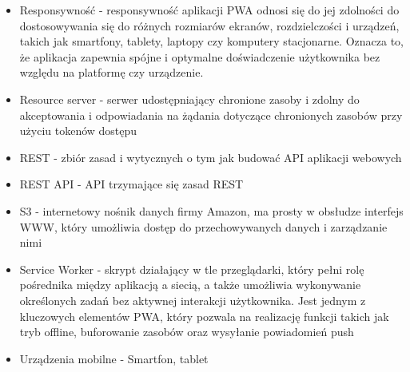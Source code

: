 \documentclass[../main.tex]{subfiles}
\begin{document}
\begin{itemize}
        \item Responsywność - responsywność aplikacji PWA odnosi się do jej zdolności do dostosowywania się do różnych rozmiarów ekranów, rozdzielczości i urządzeń, takich jak smartfony, tablety, laptopy czy komputery stacjonarne. Oznacza to, że aplikacja zapewnia spójne i optymalne doświadczenie użytkownika bez względu na platformę czy urządzenie.
        \item Resource server - serwer udostępniający chronione zasoby i zdolny do akceptowania i odpowiadania na żądania dotyczące chronionych zasobów przy użyciu tokenów dostępu
        \item REST - zbiór zasad i wytycznych o tym jak budować API aplikacji webowych
        \item REST API - API trzymające się zasad REST
        \item S3 -  internetowy nośnik danych firmy Amazon, ma prosty w obsłudze interfejs WWW, który umożliwia dostęp do przechowywanych danych i zarządzanie nimi
        \item Service Worker - skrypt działający w tle przeglądarki, który pełni rolę pośrednika między aplikacją a siecią, a także umożliwia wykonywanie określonych zadań bez aktywnej interakcji użytkownika. Jest jednym z kluczowych elementów PWA, który pozwala na realizację funkcji takich jak tryb offline, buforowanie zasobów oraz wysyłanie powiadomień push
        \item Urządzenia mobilne - Smartfon, tablet
    \end{itemize}
\end{document}
